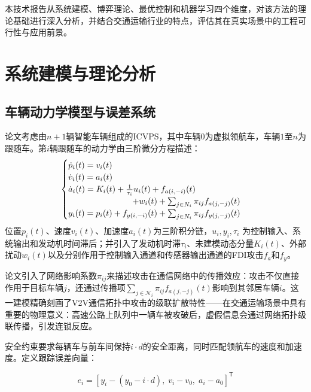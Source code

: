 \documentclass[10.5pt,a4paper,twoside,twocolumn]{ctexart}
\newcommand{\T}{\mathsf{T}}
\begin{document}
本技术报告从系统建模、博弈理论、最优控制和机器学习四个维度，对该方法的理论基础进行深入分析，并结合交通运输行业的特点，评估其在真实场景中的工程可行性与应用前景。

\section{\heiti{} 系统建模与理论分析}

\subsection{\heiti{} 车辆动力学模型与误差系统}

论文考虑由$n+1$辆智能车辆组成的ICVPS，其中车辆0为虚拟领航车，车辆$1$至$n$为跟随车。第$i$辆跟随车的动力学由三阶微分方程描述：
\begin{equation}
\begin{cases}
	\dot{p}_i(t) = v_i(t) \\
	\dot{v}_i(t) = a_i(t) \\
	\dot{a}_i(t) = K_i(t) + \frac{1}{\tau_i} u_i(t) + f_{a(i,-i)}(t) \\
\hfill +  w_i(t) + \sum_{j \in N_i} \pi_{ij}    	f_{a(j,-j)}(t) \\
	y_i(t) = p_i(t) + f_{y(i,-i)}(t) + \sum_{j \in N_i} \pi_{ij} f_{y(j,-j)}(t)
\end{cases}
\end{equation}
位置$p_i(t)$、速度$v_i(t)$、加速度$a_i(t)$为三阶积分链，$u_i, y_i, \tau_i$ 为控制输入、系统输出和发动机时间滞后；并引入了发动机时滞$\tau_i$、未建模动态分量$K_i(t)$、外部扰动$w_i(t)$以及分别作用于控制输入通道和传感器输出通道的FDI攻击$f_a$和$f_y$。

论文引入了网络影响系数$\pi_{ij}$来描述攻击在通信网络中的传播效应：攻击不仅直接作用于目标车辆$j$，还通过传播项$\sum_{j\in\mathcal{N}_i} \pi_{ij} f_{a(j,-j)}(t)$影响到其邻居车辆$i$。这一建模精确刻画了V2V通信拓扑中攻击的级联扩散特性——在交通运输场景中具有重要的物理意义：高速公路上队列中一辆车被攻破后，虚假信息会通过网络拓扑级联传播，引发连锁反应。

安全约束要求每辆车与前车间保持$i\cdot d$的安全距离，同时匹配领航车的速度和加速度。定义跟踪误差向量：

\begin{equation}
e_i = \left[ y_i - (y_0 - i \cdot d),\; v_i - v_0,\; a_i - a_0 \right]^{\T}
\label{eq:error}
\end{equation}
\end{document}
